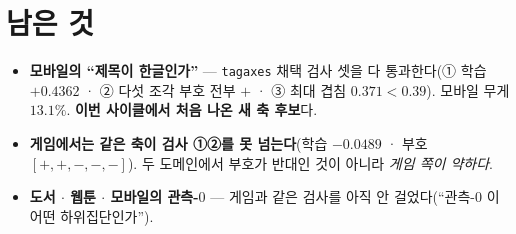 \documentclass[11pt]{article}
\begin{document}
\section*{남은 것}

\begin{itemize}
\item \textbf{모바일의 ``제목이 한글인가''} --- \texttt{tagaxes} 채택 검사
셋을 다 통과한다(① 학습 $+0.4362$ · ② 다섯 조각 부호 전부 $+$ · ③ 최대
겹침 $0.371 < 0.39$). 모바일 무게 $13.1\%$. \textbf{이번 사이클에서 처음
나온 새 축 후보}다.
\item \textbf{게임에서는 같은 축이 검사 ①②를 못 넘는다}(학습 $-0.0489$ ·
부호 $[+,+,-,-,-]$). 두 도메인에서 부호가 반대인 것이 아니라 \emph{게임
쪽이 약하다}.
\item \textbf{도서 $\cdot$ 웹툰 $\cdot$ 모바일의 관측-$0$} --- 게임과 같은
검사를 아직 안 걸었다(``관측-$0$ 이 어떤 하위집단인가'').
\end{itemize}
\end{document}

